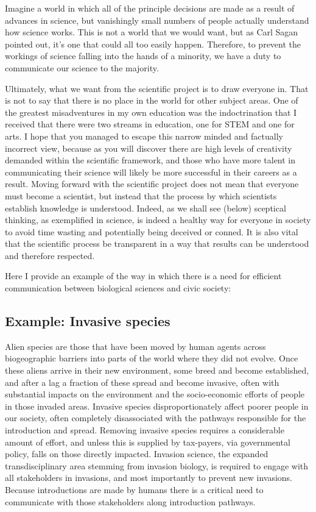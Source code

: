\documentclass[
]{krantz}
\begin{document}
Imagine a world in which all of the principle decisions are made as a result of advances in science, but vanishingly small numbers of people actually understand how science works. This is not a world that we would want, but as Carl Sagan \citep{sagan2011demon} pointed out, it's one that could all too easily happen. Therefore, to prevent the workings of science falling into the hands of a minority, we have a duty to communicate our science to the majority.

Ultimately, what we want from the scientific project is to draw everyone in. That is not to say that there is no place in the world for other subject areas. One of the greatest misadventures in my own education was the indoctrination that I received that there were two streams in education, one for STEM and one for arts. I hope that you managed to escape this narrow minded and factually incorrect view, because as you will discover there are high levels of creativity demanded within the scientific framework, and those who have more talent in communicating their science will likely be more successful in their careers as a result. Moving forward with the scientific project does not mean that everyone must become a scientist, but instead that the process by which scientists establish knowledge is understood. Indeed, as we shall see (below) sceptical thinking, as exemplified in science, is indeed a healthy way for everyone in society to avoid time wasting and potentially being deceived or conned. It is also vital that the scientific process be transparent in a way that results can be understood and therefore respected.

Here I provide an example of the way in which there is a need for efficient communication between biological sciences and civic society:

\hypertarget{example-invasive-species}{%
\subsection{Example: Invasive species}\label{example-invasive-species}}

Alien species are those that have been moved by human agents across biogeographic barriers into parts of the world where they did not evolve. Once these aliens arrive in their new environment, some breed and become established, and after a lag a fraction of these spread and become invasive, often with substantial impacts on the environment and the socio-economic efforts of people in those invaded areas. Invasive species disproportionately affect poorer people in our society, often completely disassociated with the pathways responsible for the introduction and spread. Removing invasive species requires a considerable amount of effort, and unless this is supplied by tax-payers, via governmental policy, falls on those directly impacted. Invasion science, the expanded transdisciplinary area stemming from invasion biology, is required to engage with all stakeholders in invasions, and most importantly to prevent new invasions. Because introductions are made by humans there is a critical need to communicate with those stakeholders along introduction pathways.
\end{document}
